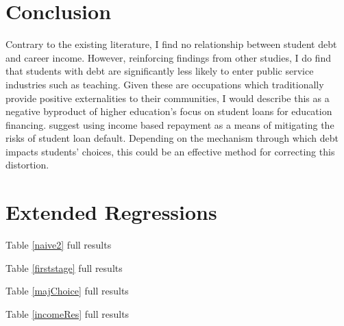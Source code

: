 \documentclass{article}
\newcommand{\regs}{../Analysis/Regressions/Output/}
\begin{document}
	\blindtext
	
	\section{Conclusion}
	
	Contrary to the existing literature, I find no relationship between student debt and career income. However, reinforcing findings from other studies, I do find that students with debt are significantly less likely to enter public service industries such as teaching. Given these are occupations which traditionally provide positive externalities to their communities, I would describe this as a negative byproduct of higher education's focus on student loans for education financing. \textcite{abraham2018} suggest using income based repayment as a means of mitigating the risks of student loan default. Depending on the mechanism through which debt impacts students' choices, this could be an effective method for correcting this distortion.
	
	\appendix
	\section{Extended Regressions}
	
	\begin{table}
		\centering
		
		\caption{Table \ref{naive2} full results}
		\label{naivefull}
	\end{table}

	\begin{table}
		\centering
		\scriptsize
		
		
		\caption{Table \ref{firststage} full results}
		\label{firststagefull}
	\end{table}

	\begin{table}
		\centering
		\scriptsize
		
		
		\caption{Table \ref{majChoice} full results}
	\end{table}

	\begin{table}
		\centering
		\scriptsize
		
		
		\caption{Table \ref{incomeRes} full results}
	\end{table}

	\pagebreak
	
	\printbibliography
	
\end{document}
